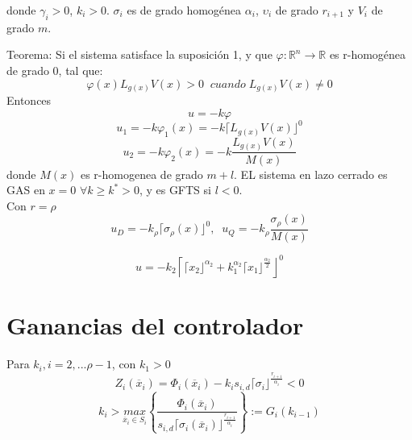     donde $\gamma_i>0$, $k_i>0$. $\sigma_i$ es de grado homogénea $\alpha_i$, $\upsilon_i$ de grado $r_{i+1}$ y $V_i$ de grado $m$.

    
    Teorema: \cite{CRUZZAVALA2017}
    Si el sistema  satisface la suposición 1, y que $\varphi:\mathbb{R}^n\rightarrow \mathbb{R}$ es r-homogénea de grado 0, tal que:
    \begin{equation*}
        \varphi(x)L_{g(x)}V(x)>0 \;\; cuando \;L_{g(x)}V(x)\neq 0
    \end{equation*}
    Entonces 
    \begin{equation*}
        u=-k\varphi
    \end{equation*}
    \begin{equation*}
        u_1=-k\varphi_1(x)=-k\lceil L_{g(x)}V(x)\rfloor^0
    \end{equation*}
    \begin{equation*}
        u_2=-k\varphi_2(x)=-k\frac{L_{g(x)}V(x)}{M(x)}
    \end{equation*}
    donde $M(x)$ es r-homogenea de grado $m+l$. EL sistema en lazo cerrado es GAS en $x=0$ $\forall k\geq k^*>0$, y es GFTS si $l<0$.\\
    Con $r=\rho$
    \begin{equation*}
        u_D=-k_\rho\lceil \sigma_{\rho}(x)\rfloor^0,\;\; u_Q=-k_\rho \frac{ \sigma_{\rho}(x)}{M(x)}
    \end{equation*}    


    \begin{equation*}
        u=-k_2 \left\lceil \lceil x_2 \rfloor^{\alpha_2}+k_1^{\alpha_2} \lceil x_1 \rfloor^{\frac{\alpha_2}{2}} \right\rfloor^0
      \end{equation*}   
\section{Ganancias del controlador}

Para $k_i, i=2,...\rho-1$, con $k_1>0$
        \begin{equation}
            Z_{i}(\overline{x}_{i})=\Phi_{i}(\overline{x}_{i})-k_{i}s_{i,d} \lceil \sigma_{i} \rfloor^{\frac{r_{i+1}}{\alpha_{i}}}<0
        \end{equation}
        \begin{equation}
            k_i>\underset{\overline{x}_i \in S_i}{max} \left \lbrace \frac{\Phi_i(\overline{x}_i)}{s_{i,d}\lceil \sigma_i(\overline{x}_i)  \rfloor^{\frac{r_{i+1}}{\alpha_i}}} \right\rbrace:=G_i(k_{i-1})
        \end{equation}


